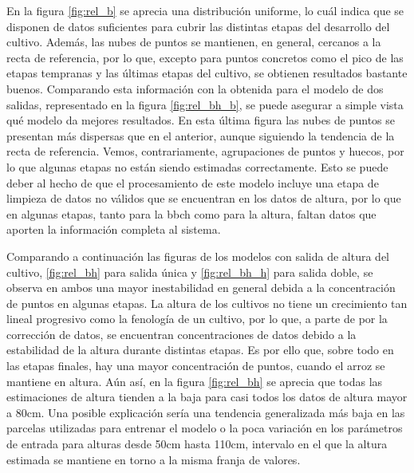 \par En la figura \ref{fig:rel_b} se aprecia una distribución uniforme, lo cuál indica que se disponen de datos suficientes para cubrir las distintas etapas del desarrollo del cultivo. Además, las nubes de puntos se mantienen, en general, cercanos a la recta de referencia, por lo que, excepto para puntos concretos como el pico de las etapas tempranas y las últimas etapas del cultivo, se obtienen resultados bastante buenos. Comparando esta información con la obtenida para el modelo de dos salidas, representado en la figura \ref{fig:rel_bh_b}, se puede asegurar a simple vista qué modelo da mejores resultados. En esta última figura las nubes de puntos se presentan más dispersas que en el anterior, aunque siguiendo la tendencia de la recta de referencia. Vemos, contrariamente, agrupaciones de puntos y huecos, por lo que algunas etapas no están siendo estimadas correctamente. Esto se puede deber al hecho de que el procesamiento de este modelo incluye una etapa de limpieza de datos no válidos que se encuentran en los datos de altura, por lo que en algunas etapas, tanto para la \gls{bbch} como  para la altura, faltan datos que aporten la información completa al sistema. 
\\
\par Comparando a continuación las figuras de los modelos con salida de altura del cultivo, \ref{fig:rel_bh} para salida única y \ref{fig:rel_bh_h} para salida doble, se observa en ambos una mayor inestabilidad en general debida a la concentración de puntos en algunas etapas. La altura de los cultivos no tiene un crecimiento tan lineal progresivo como la fenología de un cultivo, por lo que, a parte de por la corrección de datos, se encuentran concentraciones de datos debido a la estabilidad de la altura durante distintas etapas. Es por ello que, sobre todo en las etapas finales, hay una mayor concentración de puntos, cuando el arroz se mantiene en altura. Aún así, en la figura \ref{fig:rel_bh} se aprecia que todas las estimaciones de altura tienden a la baja para casi todos los datos de altura mayor a 80cm. Una posible explicación sería una tendencia generalizada más baja en las parcelas utilizadas para entrenar el modelo o la poca variación en los parámetros de entrada para alturas desde 50cm hasta 110cm, intervalo en el que la altura estimada se mantiene en torno a la misma franja de valores. 

